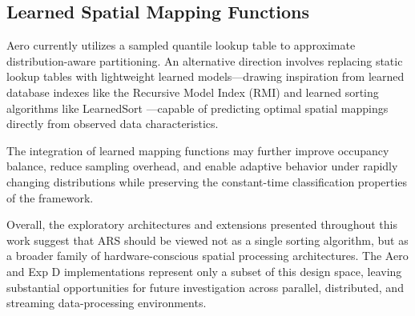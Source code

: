 \subsection{Learned Spatial Mapping Functions}
Aero currently utilizes a sampled quantile lookup table to approximate distribution-aware partitioning.
An alternative direction involves replacing static lookup tables with lightweight learned models---drawing inspiration from learned database indexes like the Recursive Model Index (RMI) \cite{kraska2018case} and learned sorting algorithms like LearnedSort \cite{khalifa2020learnedsort}---capable of predicting optimal spatial mappings directly from observed data characteristics.

The integration of learned mapping functions may further improve occupancy balance, reduce sampling overhead, and enable adaptive behavior under rapidly changing distributions while preserving the constant-time classification properties of the framework.

Overall, the exploratory architectures and extensions presented throughout this work suggest that ARS should be viewed not as a single sorting algorithm, but as a broader family of hardware-conscious spatial processing architectures.
The Aero and Exp D implementations represent only a subset of this design space, leaving substantial opportunities for future investigation across parallel, distributed, and streaming data-processing environments.
